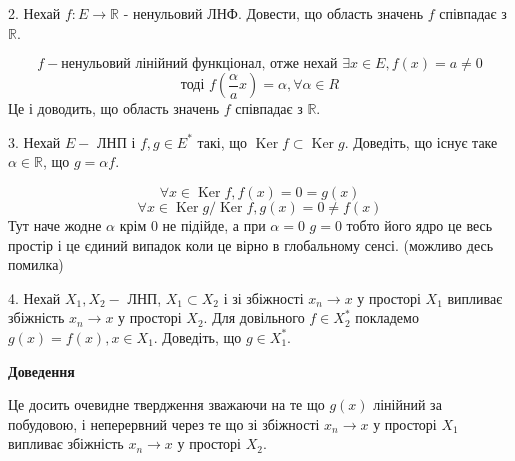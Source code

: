\begin{tcolorbox}[title=Завдання 2]
    2. Нехай $f: E \rightarrow \mathbb{R}$ - ненульовий ЛНФ. Довести, що область значень $f$ співпадає з $\mathbb{R}$.

    $$f - \text{ненульовий лінійний функціонал, отже нехай } \exists x \in E, f(x) = a \neq 0$$
    $$ \text{тоді } f(\frac{\alpha}{a} x) = \alpha , \forall \alpha \in R$$
    Це і доводить, що область значень $f$ співпадає з $\mathbb{R}$.
\end{tcolorbox}

\begin{tcolorbox}[title=Завдання 3]
    3. Нехай $E-$ ЛНП і $f, g \in E^{*}$ такі, 
    що $\operatorname{Ker} f \subset \operatorname{Ker} g$. 
    Доведіть, що існує таке $\alpha \in \mathbb{R}$, що $g=\alpha f$.

    $$ \forall x \in \operatorname{Ker} f, f(x) = 0 = g(x)$$
    $$ \forall x \in \operatorname{Ker} g / \operatorname{Ker} f, g(x) = 0 \neq f(x)$$
    Тут наче жодне $\alpha$ крім 0 не підійде, а при $\alpha = 0$ $g = 0$ тобто його ядро 
    це весь простір і це єдиний випадок коли це вірно в глобальному сенсі.
    (можливо десь помилка)
\end{tcolorbox}


\begin{tcolorbox}[title=Завдання 4]
    4. Нехай $X_{1}, X_{2}-$ ЛНП, $X_{1} \subset X_{2}$ і зі збіжності $x_{n} \rightarrow 
    x$ у просторі $X_{1}$ випливає збіжність $x_{n} \rightarrow x$ у просторі $X_{2}$. 
    Для довільного $f \in X_{2}^{*}$ покладемо $g(x)=f(x), x \in X_{1}$. 
    Доведіть, що $g \in X_{1}^{*}$.

    \begin{center}
        \textbf{Доведення}
    \end{center}

    Це досить очевидне твердження зважаючи на те що $g(x)$ лінійний за побудовою,
    і неперервний через те що зі збіжності $x_{n} \rightarrow x$ у просторі $X_{1}$ випливає збіжність $x_{n} \rightarrow x$ у просторі $X_{2}$.
\end{tcolorbox}